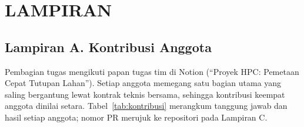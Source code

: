 \chapter*{LAMPIRAN}

\setcounter{table}{0}
\renewcommand{\thetable}{A.\arabic{table}}

\section*{Lampiran A. Kontribusi Anggota}
Pembagian tugas mengikuti papan tugas tim di Notion (``Proyek HPC: Pemetaan Cepat Tutupan Lahan''). Setiap anggota memegang satu bagian utama yang saling bergantung lewat kontrak teknis bersama, sehingga kontribusi keempat anggota dinilai setara. Tabel~\ref{tab:kontribusi} merangkum tanggung jawab dan hasil setiap anggota; nomor PR merujuk ke repositori pada Lampiran C.

